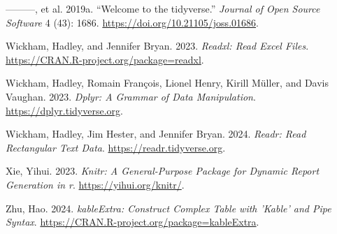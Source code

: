 \documentclass[
  letterpaper,
  DIV=11,
  numbers=noendperiod]{scrartcl}
\newlength{\cslhangindent}
\newenvironment{CSLReferences}[2] %
 {\begin{list}{}{%
  \setlength{\itemindent}{0pt}
  \setlength{\leftmargin}{0pt}
  \setlength{\parsep}{0pt}
  \ifodd #1
   \setlength{\leftmargin}{\cslhangindent}
   \setlength{\itemindent}{-1\cslhangindent}
  \fi
  \setlength{\itemsep}{#2\baselineskip}}}
 {\end{list}}
\begin{document}
\begin{CSLReferences}{1}{0}
---------, et al. 2019a. {``Welcome to the {tidyverse}.''} \emph{Journal
of Open Source Software} 4 (43): 1686.
\url{https://doi.org/10.21105/joss.01686}.

Wickham, Hadley, and Jennifer Bryan. 2023. \emph{Readxl: Read Excel
Files}. \url{https://CRAN.R-project.org/package=readxl}.

Wickham, Hadley, Romain François, Lionel Henry, Kirill Müller, and Davis
Vaughan. 2023. \emph{Dplyr: A Grammar of Data Manipulation}.
\url{https://dplyr.tidyverse.org}.

Wickham, Hadley, Jim Hester, and Jennifer Bryan. 2024. \emph{Readr: Read
Rectangular Text Data}. \url{https://readr.tidyverse.org}.

Xie, Yihui. 2023. \emph{Knitr: A General-Purpose Package for Dynamic
Report Generation in r}. \url{https://yihui.org/knitr/}.

Zhu, Hao. 2024. \emph{kableExtra: Construct Complex Table with 'Kable'
and Pipe Syntax}. \url{https://CRAN.R-project.org/package=kableExtra}.

\end{CSLReferences}
\end{document}
